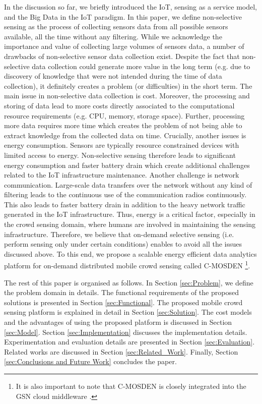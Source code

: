 \documentclass[journal]{IEEEtran}
\newcommand{\platform}{C-MOSDEN }
\begin{document}
In the discussion so far, we  briefly introduced the IoT, sensing as a service model, and the Big Data in the IoT paradigm. In this paper, we define non-selective sensing as the process of collecting sensors data from all possible sensors available, all the time without any filtering. While we acknowledge the importance and  value of collecting large volumes of sensors data, a number of drawbacks of non-selective sensor data collection  exist.  Despite the fact that non-selective data collection could generate more value in  the long term (e.g. due to discovery of knowledge that were not intended during the time of data collection), it definitely  creates a problem (or difficulties) in the short term. The main issue in non-selective data collection is cost. Moreover, the processing and storing of data lead to more costs directly associated to the computational resource requirements (e.g. CPU, memory, storage space). Further, processing more data requires more time which creates the problem of not being able to extract knowledge from the collected data on time. Crucially, another issues is energy consumption. Sensors are typically resource constrained devices with limited access to energy. Non-selective sensing therefore leads to significant energy consumption and faster battery drain which create additional challenges related to the IoT infrastructure maintenance. Another challenge is  network communication. Large-scale data transfers over the network without any kind of filtering leads to the continuous use of the communication radios continuously. This also leads to faster battery drain in addition to the heavy network traffic generated in the IoT infrastructure. Thus, energy is a critical factor, especially in the crowd sensing domain, where humans  are involved in maintaining the sensing infrastructure. Therefore, we believe that on-demand selective sensing (i.e. perform sensing only under certain conditions) enables to avoid all the issues discussed above. To this end, we propose a scalable energy efficient data analytics platform for on-demand distributed mobile crowd sensing called \platform\footnote{It is also important to note that \platform is closely integrated into the GSN cloud middleware \cite{P022}.}.  

The rest of this paper is organised as follows. In Section \ref{sec:Problem}, we define the problem domain in details. The functional requirements of the proposed solutions is presented in Section \ref{sec:Functional}. The proposed mobile crowd sensing platform is explained in detail in Section \ref{sec:Solution}. The cost models and the advantages of using the proposed platform is discussed in Section \ref{sec:Model}. Section \ref{sec:Implementation} discusses the implementation details. Experimentation and evaluation details are presented in Section \ref{sec:Evaluation}.  Related works are discussed in Section \ref{sec:Related_Work}. Finally, Section \ref{sec:Conclusions and Future Work} concludes the paper.
\end{document}
